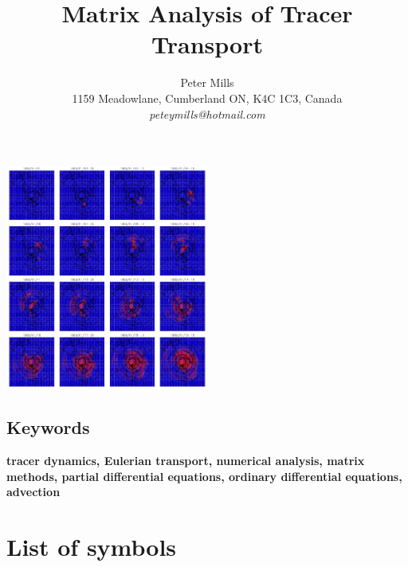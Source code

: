 \documentclass[11pt]{article}
\begin{document}
\title{Matrix Analysis of Tracer Transport}
\author{Peter Mills\\
1159 Meadowlane, Cumberland ON, K4C 1C3, Canada\\
\textit{peteymills@hotmail.com}}

\maketitle

\begin{center}
\includegraphics[width=0.5\textwidth]{tt_cover_graphic}
\end{center}

\pagestyle{myheadings}

\begin{abstract}
	
\end{abstract}

\subsection*{Keywords}
\textbf{tracer dynamics, Eulerian transport, numerical analysis, matrix methods, partial differential equations, ordinary differential equations, advection}

\tableofcontents



\section*{List of symbols}



\newpage


\end{document}
